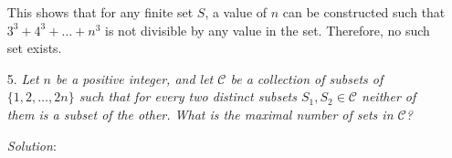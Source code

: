 \documentclass{article}
\begin{document}
\begin{enumerate}
This shows that for any finite set $S$, a value of $n$ can be constructed such that $3^3 + 4^3 + \dots + n^3$ is not divisible by any value in the set. Therefore, no such set exists.

\item[5.] %
\textit{\newcommand{\CC}{\mathcal{C}}
Let $n$ be a positive integer, and let $\CC$ be a collection of subsets of $\{1, 2, \dotsc, 2n\}$ such that for every two distinct subsets $S_1, S_2 \in \CC$ neither of them is a subset of the other.
What is the maximal number of sets in $\CC$?}

\textit{Solution}:


\end{enumerate}
\end{document}
